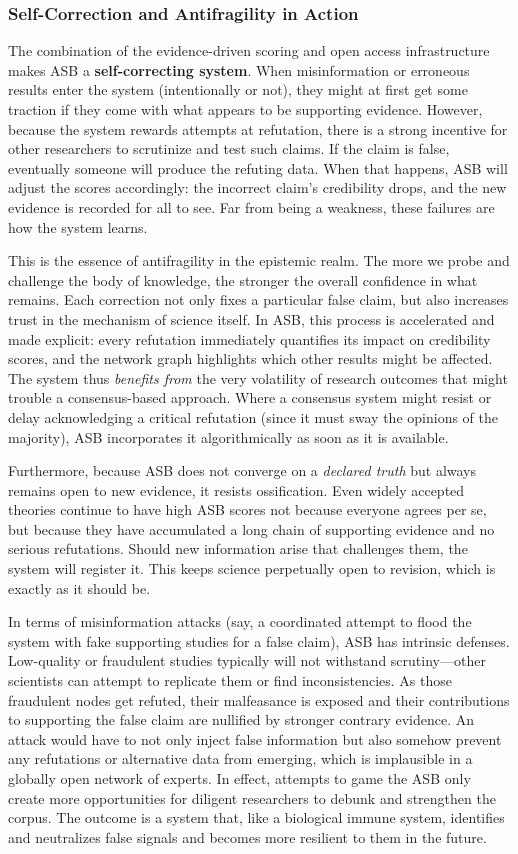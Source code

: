 \documentclass{article}
\begin{document}
\subsubsection{Self-Correction and Antifragility in Action}
The combination of the evidence-driven scoring and open access infrastructure makes ASB a \textbf{self-correcting system}. When misinformation or erroneous results enter the system (intentionally or not), they might at first get some traction if they come with what appears to be supporting evidence. However, because the system rewards attempts at refutation, there is a strong incentive for other researchers to scrutinize and test such claims. If the claim is false, eventually someone will produce the refuting data. When that happens, ASB will adjust the scores accordingly: the incorrect claim's credibility drops, and the new evidence is recorded for all to see. Far from being a weakness, these failures are how the system learns.

This is the essence of antifragility in the epistemic realm. The more we probe and challenge the body of knowledge, the stronger the overall confidence in what remains. Each correction not only fixes a particular false claim, but also increases trust in the mechanism of science itself. In ASB, this process is accelerated and made explicit: every refutation immediately quantifies its impact on credibility scores, and the network graph highlights which other results might be affected. The system thus \emph{benefits from} the very volatility of research outcomes that might trouble a consensus-based approach. Where a consensus system might resist or delay acknowledging a critical refutation (since it must sway the opinions of the majority), ASB incorporates it algorithmically as soon as it is available.

Furthermore, because ASB does not converge on a \emph{declared truth} but always remains open to new evidence, it resists ossification. Even widely accepted theories continue to have high ASB scores not because everyone agrees per se, but because they have accumulated a long chain of supporting evidence and no serious refutations. Should new information arise that challenges them, the system will register it. This keeps science perpetually open to revision, which is exactly as it should be.

In terms of misinformation attacks (say, a coordinated attempt to flood the system with fake supporting studies for a false claim), ASB has intrinsic defenses. Low-quality or fraudulent studies typically will not withstand scrutiny—other scientists can attempt to replicate them or find inconsistencies. As those fraudulent nodes get refuted, their malfeasance is exposed and their contributions to supporting the false claim are nullified by stronger contrary evidence. An attack would have to not only inject false information but also somehow prevent any refutations or alternative data from emerging, which is implausible in a globally open network of experts. In effect, attempts to game the ASB only create more opportunities for diligent researchers to debunk and strengthen the corpus. The outcome is a system that, like a biological immune system, identifies and neutralizes false signals and becomes more resilient to them in the future.
\end{document}
